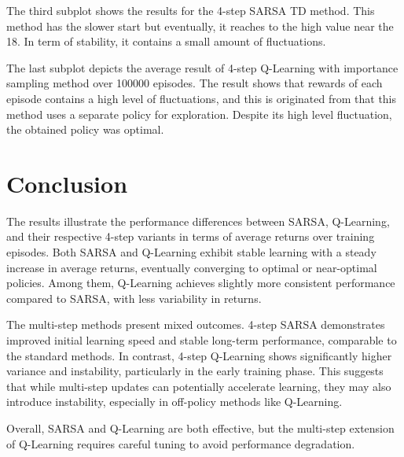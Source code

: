 \documentclass[lettersize,journal]{IEEEtran}
\begin{document}
The third subplot shows the results for the 4-step SARSA TD method. This method has the slower start but eventually, it reaches to the high value near the 18. In term of stability, it contains a small amount of fluctuations. 

The last subplot depicts the average result of 4-step Q-Learning with importance sampling method over 100000 episodes. The result shows that rewards of each episode contains a high level of fluctuations, and this is originated from that this method uses a separate policy for exploration. Despite its high level fluctuation, the obtained policy was optimal. 

\section{Conclusion}
The results illustrate the performance differences between SARSA, Q-Learning, and their respective 4-step variants in terms of average returns over training episodes. Both SARSA and Q-Learning exhibit stable learning with a steady increase in average returns, eventually converging to optimal or near-optimal policies. Among them, Q-Learning achieves slightly more consistent performance compared to SARSA, with less variability in returns.\par

The multi-step methods present mixed outcomes. 4-step SARSA demonstrates improved initial learning speed and stable long-term performance, comparable to the standard methods. In contrast, 4-step Q-Learning shows significantly higher variance and instability, particularly in the early training phase. This suggests that while multi-step updates can potentially accelerate learning, they may also introduce instability, especially in off-policy methods like Q-Learning.\par

Overall, SARSA and Q-Learning are both effective, but the multi-step extension of Q-Learning requires careful tuning to avoid performance degradation.


\vfill
\end{document}
